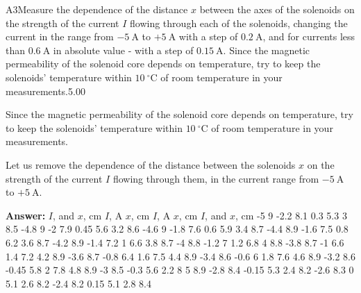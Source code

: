 \documentclass[11pt,a4paper]{article}
\begin{document}
\begin{solcard}{A3}{Measure the dependence of the distance $x$ between the axes of the solenoids on the strength of the current $I$ flowing through each of the solenoids, changing the current in the range from $-5~\mathrm{A}$ to $+5~\mathrm{A}$ with a step of $0.2~\mathrm{A}$, and for currents less than $0.6~\mathrm{A}$ in absolute value - with a step of $0.15~\mathrm{A}$. Since the magnetic permeability of the solenoid core depends on temperature, try to keep the solenoids' temperature within $10~{}^\circ\mathrm C$ of room temperature in your measurements.}{5.00}

Since the magnetic permeability of the solenoid core depends on temperature, try to keep the solenoids' temperature within $10~{}^\circ\mathrm C$ of room temperature in your measurements.


Let us remove the dependence of the distance between the solenoids $x$ on the strength of the current $I$ flowing through them, in the current range from $-5~\mathrm{A}$ to $+5~\mathrm{A}$.

\par\smallskip\noindent\textbf{Answer:} $I$, and $x$, cm $I$, A $x$, cm $I$, A $x$, cm $I$, and $x$, cm -5 9 -2.2 8.1 0.3 5.3 3 8.5 -4.8 9 -2 7.9 0.45 5.6 3.2 8.6 -4.6 9 -1.8 7.6 0.6 5.9 3.4 8.7 -4.4 8.9 -1.6 7.5 0.8 6.2 3.6 8.7 -4.2 8.9 -1.4 7.2 1 6.6 3.8 8.7 -4 8.8 -1.2 7 1.2 6.8 4 8.8 -3.8 8.7 -1 6.6 1.4 7.2 4.2 8.9 -3.6 8.7 -0.8 6.4 1.6 7.5 4.4 8.9 -3.4 8.6 -0.6 6 1.8 7.6 4.6 8.9 -3.2 8.6 -0.45 5.8 2 7.8 4.8 8.9 -3 8.5 -0.3 5.6 2.2 8 5 8.9 -2.8 8.4 -0.15 5.3 2.4 8.2 -2.6 8.3 0 5.1 2.6 8.2 -2.4 8.2 0.15 5.1 2.8 8.4
\end{solcard}
\end{document}

